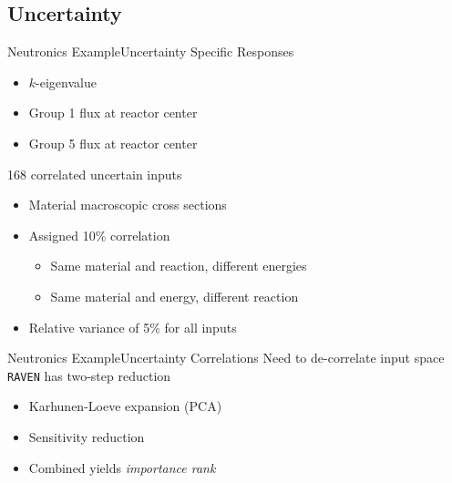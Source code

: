 \documentclass{beamer}
\newcommand{\raven}{\texttt{RAVEN}}
\begin{document}
\subsection{Uncertainty}
\begin{frame}{Neutronics Example}{Uncertainty}%
  \vfill
  Specific Responses
  \begin{itemize}
    \item $k$-eigenvalue
    \item Group 1 flux at reactor center
    \item Group 5 flux at reactor center
  \end{itemize}
  \vfill
  168 correlated uncertain inputs
  \begin{itemize}
    \item Material macroscopic cross sections
    \item Assigned 10\% correlation
      \begin{itemize}
        \item Same material and reaction, different energies
        \item Same material and energy, different reaction
      \end{itemize}
    \item Relative variance of 5\% for all inputs
  \end{itemize}
  \vfill
\end{frame}

\begin{frame}{Neutronics Example}{Uncertainty Correlations}\vspace{-20pt}
  \vfill
  Need to de-correlate input space
  \vfill
  \raven{} has two-step reduction
  \begin{itemize}
    \item Karhunen-Loeve expansion (PCA)
    \item Sensitivity reduction
    \item Combined yields \emph{importance rank}
  \end{itemize}
  \vfill
\end{frame}
\end{document}
